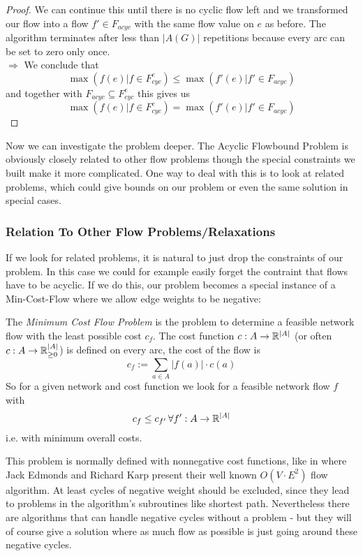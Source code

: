 \begin{proof}
We can continue this until there is no cyclic flow left and we transformed our flow into a flow $f'\in F_{acyc}$ with 
the same flow value on $e$ as before. The algorithm terminates after less than $|A(G)|$ repetitions because every arc 
can be set to zero only once.\\
$\Rightarrow $ We conclude that $$\max(f(e)|f\in F_{cyc}^e)\le \max(f'(e)|f'\in F_{acyc})$$ and together with 
$F_{acyc}\subseteq F_{cyc}^e $ this gives us
$$\max(f(e)|f\in F_{cyc}^e)= \max(f'(e)|f'\in F_{acyc}) $$
\end{proof}


Now we can investigate the problem deeper. The Acyclic Flowbound Problem is obviously closely related to other flow 
problems though the special constraints we built make it more complicated. One way to deal with this is to look at 
related problems, which could give bounds on our problem or even the same solution in special cases.

\subsubsection{Relation To Other Flow Problems/Relaxations}
\label{sect:mincostflow}
If we look for related problems, it is natural to just drop the constraints of our problem. In this case we could for 
example easily forget the contraint that flows have to be acyclic. If we do this, our problem becomes a special 
instance of a Min-Cost-Flow where we allow edge weights to be negative:

\begin{definition}\label{def:mincostflow}
 The \textit{Minimum Cost Flow Problem} is the problem to determine a feasible network flow with the least possible 
cost $c_f$. The cost function $c:A\to\mathbb{R}^{|A|}$ (or often $c:A\to\mathbb{R}^{|A|}_{\ge 0}$) is defined on every arc, the cost of 
the flow 
is $$c_f := \sum_{a\in A}|f(a)|\cdot c(a)$$ So for a given network and cost function we look for a feasible network 
flow $f$ with $$c_f\le c_{f'}\,\forall f':A\to\mathbb{R}^{|A|}$$ i.e. with minimum overall costs.
\end{definition}

This problem is normally defined with nonnegative cost functions, like in \cite{EdmondsKarp1972} where 
Jack Edmonds and Richard Karp present their well known $O(V\cdot E^2)$ flow algorithm. At least cycles of negative 
weight should be excluded, since they lead to problems in the algorithm's subroutines like shortest path. Nevertheless 
there are algorithms that can handle negative cycles without a problem - but they will of course give a solution 
where as much flow as possible is just going around these negative cycles. 

